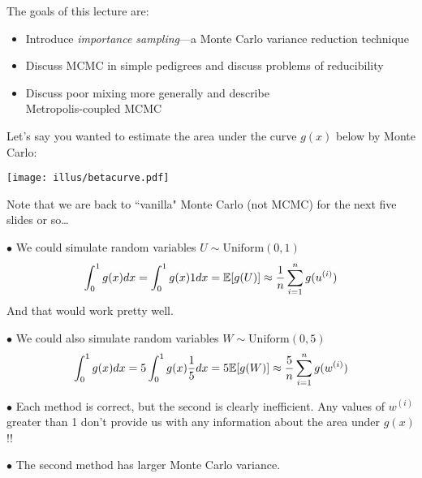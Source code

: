 

\newcommand{\bY}{{\bm{Y}}}
\newcommand{\bX}{{\bm{X}}}
 
 
The goals of this lecture are:
\begin{itemize}
\item Introduce {\em importance sampling}---a Monte Carlo variance reduction technique
\item Discuss MCMC in simple pedigrees and discuss problems of reducibility
\item Discuss poor mixing more generally and describe \\ Metropolis-coupled MCMC
\end{itemize}


\vspace*{-.45in}
Let's say you wanted to estimate the area under the curve $g(x)$ below by Monte Carlo:
\begin{center}
\texttt{[image: illus/betacurve.pdf]}
\end{center}
\enlargethispage*{100pt}
Note that we are back to ``vanilla" Monte Carlo (not MCMC) for the next five slides or so\ldots



\newpage
$\bullet$ We could simulate random variables $U\sim\mathrm{Uniform}(0,1)$
\[
\int_0^1g(x)dx = \int_0^1g(x) 1 dx = \Bbb{E}[g(U)] \approx \frac{1}{n}\sum_{i=1}^n g(u^{(i)})
\]
And that would work pretty well.

$\bullet$ We could also simulate random variables $W\sim\mathrm{Uniform}(0,5)$
\[
\int_0^1g(x)dx = 5\int_0^1g(x) \frac{1}{5} dx = 5\Bbb{E}[g(W)] \approx \frac{5}{n}\sum_{i=1}^n g(w^{(i)})
\]

$\bullet$ Each method is correct, but the second is clearly inefficient.  Any values of $w^{(i)}$ greater than 1 don't provide us with any information about the area under $g(x)$!!  

$\bullet$ The second method has larger Monte Carlo variance.

